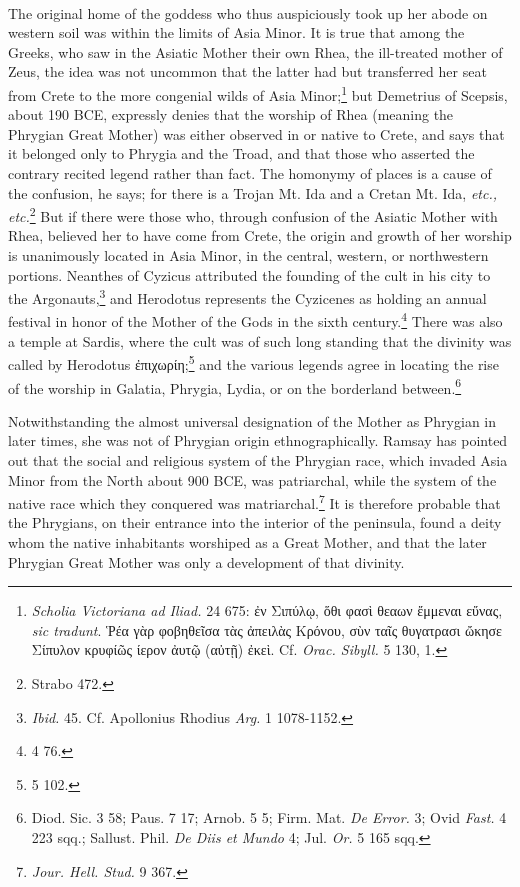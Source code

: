 \documentclass[a4paper, 11pt, oneside, polutonikogreek, english]{article}
\begin{document}
\paragraph{}
The original home of the goddess who thus auspiciously took up her abode on western soil was within the limits of Asia Minor. It is true that among the Greeks, who saw in the Asiatic Mother their own Rhea, the ill-treated mother of Zeus, the idea was not uncommon that the latter had but transferred her seat from Crete to the more congenial wilds of Asia Minor;\footnote{\emph{Scholia Victoriana ad Iliad.} 24 675: ἐν Σιπύλῳ, ὅθι φασὶ θεαων ἔμμεναι εὔνας, \emph{sic tradunt}. Ῥέα γὰρ φοβηθεῖσα τὰς ἀπειλὰς Κρόνου, σὺν ταῖς θυγατρασι ὤκησε Σίπυλον κρυφίῶς ίερον ἀυτῷ (αὐτῇ) ἐκεὶ. Cf. \emph{Orac. Sibyll.} 5 130, 1.} but Demetrius of Scepsis, about 190 \textsc{BCE}, expressly denies that the worship of Rhea (meaning the Phrygian Great Mother) was either observed in or native to Crete, and says that it belonged only to Phrygia and the Troad, and that those who asserted the contrary recited legend rather than fact. The homonymy of places is a cause of the confusion, he says; for there is a Trojan Mt. Ida and a Cretan Mt. Ida, \emph{etc., etc.}\footnote{Strabo 472.} But if there were those who, through confusion of the Asiatic Mother with Rhea, believed her to have come from Crete, the origin and growth of her worship is unanimously located in Asia Minor, in the central, western, or northwestern portions. Neanthes of Cyzicus attributed the founding of the cult in his city to the Argonauts,\footnote{\emph{Ibid.} 45. Cf. Apollonius Rhodius \emph{Arg.} 1 1078-1152.} and Herodotus represents the Cyzicenes as holding an annual festival in honor of the Mother of the Gods in the sixth century.\footnote{4 76.} There was also a temple at Sardis, where the cult was of such long standing that the divinity was called by Herodotus ἐπιχωρίη;\footnote{5 102.} and the various legends agree in locating the rise of the worship in Galatia, Phrygia, Lydia, or on the borderland between.\footnote{Diod. Sic. 3 58; Paus. 7 17; Arnob. 5 5; Firm. Mat. \emph{De Error.} 3; Ovid \emph{Fast.} 4 223 sqq.; Sallust. Phil. \emph{De Diis et Mundo} 4; Jul. \emph{Or.} 5 165 sqq.}

Notwithstanding the almost universal designation of the Mother as Phrygian in later times, she was not of Phrygian origin ethnographically. Ramsay has pointed out that the social and religious system of the Phrygian race, which invaded Asia Minor from the North about 900 \textsc{BCE}, was patriarchal, while the system of the native race which they conquered was matriarchal.\footnote{\emph{Jour. Hell. Stud.} 9 367.} It is therefore probable that the Phrygians, on their entrance into the interior of the peninsula, found a deity whom the native inhabitants worshiped as a Great Mother, and that the later Phrygian Great Mother was only a development of that divinity.
\end{document}
